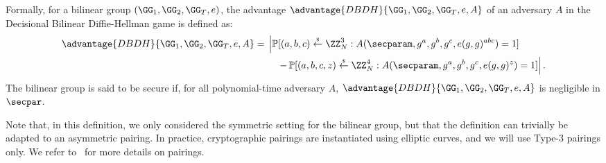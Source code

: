 Formally, for a bilinear group $(\GG_1, \GG_2, \GG_T, e)$, the advantage $\advantage{DBDH}{\GG_1, \GG_2, \GG_T, e, A}$ of an adversary $A$ in the Decisional Bilinear Diffie-Hellman game is defined as:
\[
	\advantage{DBDH}{\GG_1, \GG_2, \GG_T, e, A} = 
				\begin{multlined}[t]
				\left| \Prob[(a,b,c) \getsr \ZZ_N^3 : A(\secparam, g^a, g^b, g^c, e(g,g)^{abc}) = 1] \right.\\
				\left. - \Prob[(a,b,c,z) \getsr \ZZ_N^4 : A(\secparam, g^a, g^b, g^c, e(g,g)^{z}) = 1] \right|.
				\end{multlined}
\]
The bilinear group is said to be secure if, for all polynomial-time adversary $A$, $\advantage{DBDH}{\GG_1, \GG_2, \GG_T, e, A}$ is negligible in $\secpar$.


Note that, in this definition, we only considered the symmetric setting for the bilinear group, but that the definition can trivially be adapted to an asymmetric pairing.
In practice, cryptographic pairings are instantiated using elliptic curves, and we will use Type-3 pairings only.
We refer to~\cite{EPRINT:GalPatSma06} for more details on pairings.




